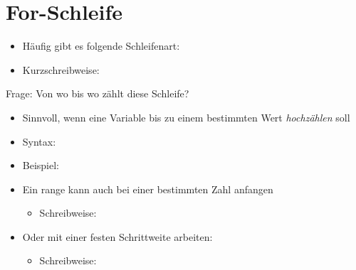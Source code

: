 \section{For-Schleife}
\begin{frame}
    \slidehead

    \begin{itemize}
        \vspace{-1ex}
        \item Häufig gibt es folgende Schleifenart:
            \vspace{-1ex}
            \pause
            \vspace{-1ex}
        \item Kurzschreibweise:
            \vspace{-1ex}
            \vspace{-1ex}
    \end{itemize}\pause
    \begin{block}{Frage:}
        Von wo bis wo zählt diese Schleife?
    \end{block}
\end{frame}

\begin{frame}
    \slidehead

    \begin{itemize}
        \item Sinnvoll, wenn eine Variable bis zu einem bestimmten Wert \textit{hochzählen} soll
        \item Syntax:
        \item Beispiel:
    \end{itemize}
\end{frame}

\begin{frame}
    \slidehead

    \begin{itemize}
        \item Ein range kann auch bei einer bestimmten Zahl anfangen
            \begin{itemize}
                \item Schreibweise: 
            \end{itemize}
        \item Oder mit einer festen Schrittweite arbeiten:
            \begin{itemize}
                \item Schreibweise: 
            \end{itemize}
    \end{itemize}
\end{frame}

